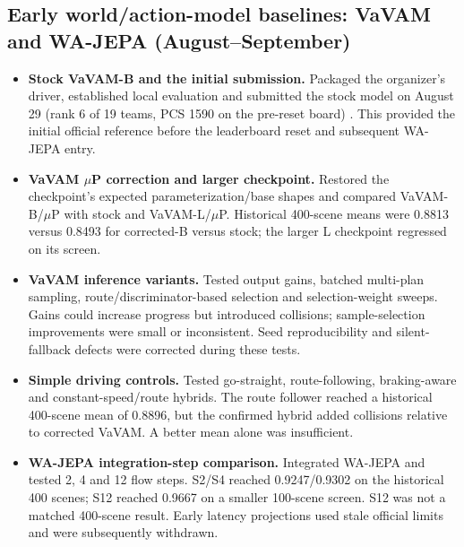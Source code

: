 \begingroup
{}

\subsection{Early world/action-model baselines: VaVAM and WA-JEPA (August--September)}
\begin{itemize}\setlength{\itemsep}{3pt}\setlength{\parsep}{0pt}\setlength{\parskip}{0pt}\setlength{\topsep}{3pt}
\item \textbf{Stock VaVAM-B and the initial submission.} Packaged the organizer's driver, established local evaluation and submitted the stock model on August 29 (rank 6 of 19 teams, PCS 1590 on the pre-reset board) \cite{vavam}. This provided the initial official reference before the leaderboard reset and subsequent WA-JEPA entry.
\item \textbf{VaVAM $\mu$P correction and larger checkpoint.} Restored the checkpoint's expected parameterization/base shapes and compared VaVAM-B/$\mu$P \cite{vavam,mup} with stock and VaVAM-L/$\mu$P. Historical 400-scene means were 0.8813 versus 0.8493 for corrected-B versus stock; the larger L checkpoint regressed on its screen.
\item \textbf{VaVAM inference variants.} Tested output gains, batched multi-plan sampling, route/discriminator-based selection and selection-weight sweeps. Gains could increase progress but introduced collisions; sample-selection improvements were small or inconsistent. Seed reproducibility and silent-fallback defects were corrected during these tests.
\item \textbf{Simple driving controls.} Tested go-straight, route-following, braking-aware and constant-speed/route hybrids. The route follower reached a historical 400-scene mean of 0.8896, but the confirmed hybrid added collisions relative to corrected VaVAM. A better mean alone was insufficient.
\item \textbf{WA-JEPA integration-step comparison.} Integrated WA-JEPA \cite{wajepa} and tested 2, 4 and 12 flow steps. S2/S4 reached 0.9247/0.9302 on the historical 400 scenes; S12 reached 0.9667 on a smaller 100-scene screen. S12 was not a matched 400-scene result. Early latency projections used stale official limits and were subsequently withdrawn.

\end{itemize}
